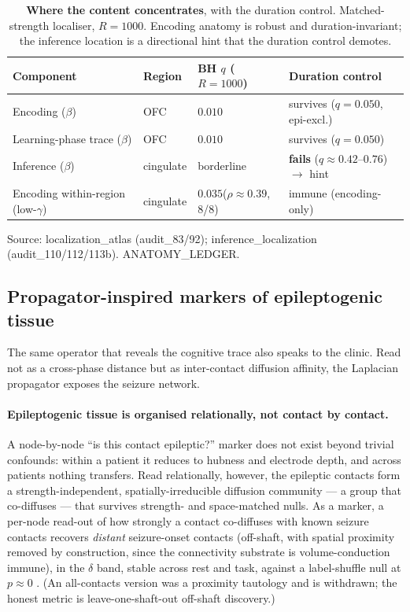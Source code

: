 \documentclass[11pt]{article}
\begin{document}
\begin{table}[t]
\centering
\caption{\textbf{Where the content concentrates}, with the duration control.
Matched-strength localiser, $R=1000$. Encoding anatomy is robust and
duration-invariant; the inference location is a directional hint that the
duration control demotes.}
\label{tab:loc}
\begin{tabular}{llll}
\toprule
Component & Region & BH $q$ ($R{=}1000$) & Duration control \\
\midrule
Encoding ($\beta$)                 & OFC       & $0.010$ & survives ($q=0.050$, epi-excl.) \\
Learning-phase trace ($\beta$)     & OFC       & $0.010$ & survives ($q=0.050$) \\
Inference ($\beta$)                & cingulate & borderline & \textbf{fails} ($q\approx0.42$--$0.76$) $\rightarrow$ hint \\
Encoding within-region (low-$\gamma$) & cingulate & $0.035$\;($\rho{\approx}0.39$, 8/8) & immune (encoding-only) \\
\bottomrule
\end{tabular}
\par\smallskip
{\footnotesize Source: localization\_atlas (audit\_83/92); inference\_localization
(audit\_110/112/113b). ANATOMY\_LEDGER.}
\end{table}

\subsection{Propagator-inspired markers of epileptogenic tissue}

The same operator that reveals the cognitive trace also speaks to the clinic.
Read not as a cross-phase distance but as inter-contact diffusion affinity, the
Laplacian propagator exposes the seizure network.

\paragraph{Epileptogenic tissue is organised relationally, not contact by
contact.}
A node-by-node ``is this contact epileptic?'' marker does not exist beyond
trivial confounds: within a patient it reduces to hubness and electrode depth,
and across patients nothing transfers. Read relationally, however, the
epileptic contacts form a strength-independent, spatially-irreducible diffusion
community --- a group that co-diffuses --- that survives strength- and
space-matched nulls. As a marker, a per-node read-out of how strongly a contact
co-diffuses with known seizure contacts recovers \emph{distant} seizure-onset
contacts (off-shaft, with spatial proximity removed by construction, since the
connectivity substrate is volume-conduction immune), in the $\delta$ band, stable
across rest and task, against a label-shuffle null at $p\approx0$
. (An all-contacts version was a proximity tautology and is withdrawn; the honest
metric is leave-one-shaft-out off-shaft discovery.)
\end{document}
